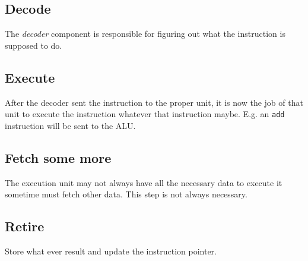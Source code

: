 \subsection{Decode}
The \emph{decoder} component is responsible for figuring out what the instruction is supposed to do.

\subsection{Execute}
After the decoder sent the instruction to the proper unit, it is now the job of that unit to execute the instruction whatever that instruction maybe. E.g. an \texttt{add} instruction will be sent to the ALU.

\subsection{Fetch some more}
The execution unit may not always have all the necessary data to execute it sometime must fetch other data. This step is not always necessary.

\subsection{Retire}
Store what ever result and update the instruction pointer.
